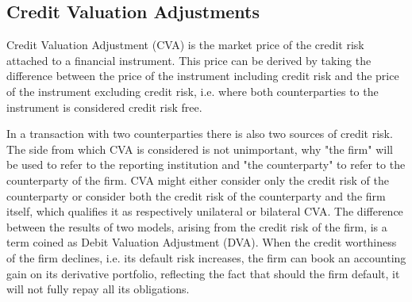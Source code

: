\documentclass[../../../main.tex]{subfiles}
\begin{document}
    \subsection{Credit Valuation Adjustments}
        Credit Valuation Adjustment (CVA) is the market price of the credit risk attached to a financial instrument.
        This price can be derived by taking the difference between the price of the instrument including credit risk
        and the price of the instrument excluding credit risk, 
        i.e. where both counterparties to the instrument is considered credit risk free.

        In a transaction with two counterparties there is also two sources of credit risk.
        The side from which CVA is considered is not unimportant, 
        why "the firm" will be used to refer to the reporting institution 
        and "the counterparty" to refer to the counterparty of the firm.
        CVA might either consider only the credit risk of the counterparty 
        or consider both the credit risk of the counterparty and the firm itself,
        which qualifies it as respectively unilateral or bilateral CVA.
        The difference between the results of two models, arising from the credit risk of the firm,
        is a term coined as Debit Valuation Adjustment (DVA).
        When the credit worthiness of the firm declines, i.e. its default risk increases,
        the firm can book an accounting gain on its derivative portfolio,
        reflecting the fact that should the firm default, it will not fully repay all its obligations.
\end{document}
